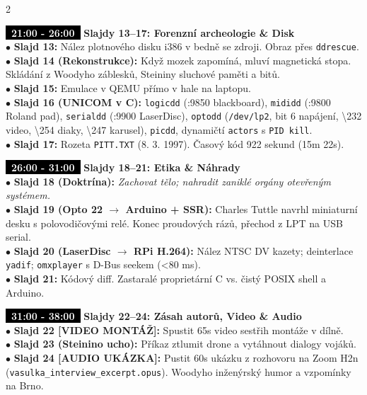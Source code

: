 \documentclass[a4paper,9.5pt]{article}
\newcommand{\badge}[1]{\textbf{\colorbox{black}{\textcolor{white}{\footnotesize~#1~}}}}
\begin{document}
\begin{multicols}{2}
\columnbreak

\begin{tcolorbox}
\badge{21:00 - 26:00} \textbf{Slajdy 13--17: Forenzní archeologie \& Disk}\\
$\bullet$ \textbf{Slajd 13:} Nález plotnového disku i386 v bedně se zdroji. Obraz přes \texttt{ddrescue}.\\
$\bullet$ \textbf{Slajd 14 (Rekonstrukce):} Když mozek zapomíná, mluví magnetická stopa. Skládání z Woodyho záblesků, Steininy sluchové paměti a bitů.\\
$\bullet$ \textbf{Slajd 15:} Emulace v QEMU přímo v hale na laptopu.\\
$\bullet$ \textbf{Slajd 16 (UNICOM v C):} \texttt{logicdd} (:9850 blackboard), \texttt{mididd} (:9800 Roland pad), \texttt{serialdd} (:9900 LaserDisc), \texttt{optodd} (\texttt{/dev/lp2}, bit 6 napájení, \textbackslash232 video, \textbackslash254 diaky, \textbackslash247 karusel), \texttt{picdd}, dynamičtí \texttt{actors} s \texttt{PID kill}.\\
$\bullet$ \textbf{Slajd 17:} Rozeta \texttt{PITT.TXT} (8. 3. 1997). Časový kód 922 sekund (15m 22s).
\end{tcolorbox}

\begin{tcolorbox}
\badge{26:00 - 31:00} \textbf{Slajdy 18--21: Etika \& Náhrady}\\
$\bullet$ \textbf{Slajd 18 (Doktrína):} \textit{Zachovat tělo; nahradit zaniklé orgány otevřeným systémem.}\\
$\bullet$ \textbf{Slajd 19 (Opto 22 $\rightarrow$ Arduino + SSR):} Charles Tuttle navrhl miniaturní desku s polovodičovými relé. Konec proudových rázů, přechod z LPT na USB serial.\\
$\bullet$ \textbf{Slajd 20 (LaserDisc $\rightarrow$ RPi H.264):} Nález NTSC DV kazety; deinterlace \texttt{yadif}; \texttt{omxplayer} s D-Bus seekem (<80 ms).\\
$\bullet$ \textbf{Slajd 21:} Kódový diff. Zastaralé proprietární C vs. čistý POSIX shell a Arduino.
\end{tcolorbox}

\begin{tcolorbox}
\badge{31:00 - 38:00} \textbf{Slajdy 22--24: Zásah autorů, Video \& Audio}\\
$\bullet$ \textbf{Slajd 22 [VIDEO MONTÁŽ]:} Spustit 65s video sestřih montáže v dílně.\\
$\bullet$ \textbf{Slajd 23 (Steinino ucho):} Příkaz ztlumit drone a vytáhnout dialogy vojáků.\\
$\bullet$ \textbf{Slajd 24 [AUDIO UKÁZKA]:} Pustit 60s ukázku z rozhovoru na Zoom H2n (\texttt{vasulka\_interview\_excerpt.opus}). Woodyho inženýrský humor a vzpomínky na Brno.
\end{tcolorbox}


\end{multicols}
\end{document}
